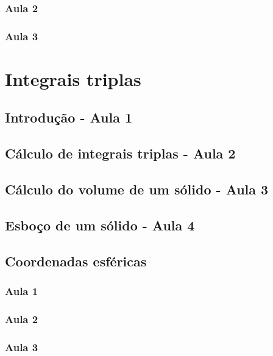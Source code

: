 \documentclass[
	12pt,				%
	openright,			%
	twoside,			%
	a4paper,			%
	english,			%
	french,				%
	spanish,			%
	brazil,				%
]{abntex2}
\begin{document}
		\subsection{Aula 2}
				
		\subsection{Aula 3}
			
\chapter{Integrais triplas}\label{integrais_triplas}
	\section{Introdução - Aula 1}
				
	\section{Cálculo de integrais triplas - Aula 2}
			
	\section{Cálculo do volume de um sólido - Aula 3}
			
	\section{Esboço de um sólido - Aula 4}
			
	\section{Coordenadas esféricas}
		\subsection{Aula 1}
					
		\subsection{Aula 2}
					
		\subsection{Aula 3}
					
\end{document}
